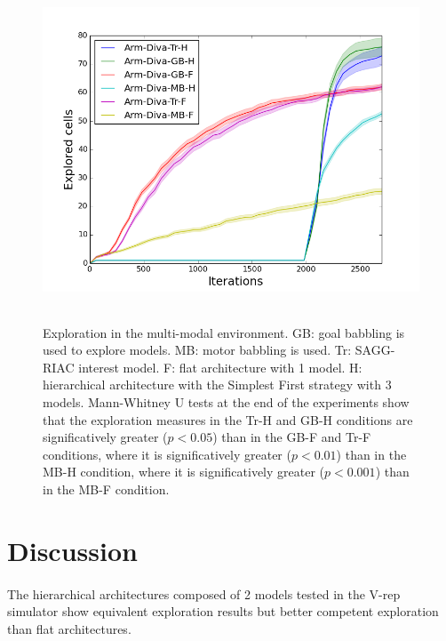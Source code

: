 \documentclass[12pt]{article}
\begin{document}
		\begin{figure}[H]
			\centering
			\includegraphics[height=4in]{./include/explo-2015-05-27_11-51-43-ARM-DIVA.png}
			\caption{Exploration in the multi-modal environment. GB: goal babbling is used to explore models. MB: motor babbling is used. Tr: SAGG-RIAC interest model. F: flat architecture with 1 model. 
			H: hierarchical architecture with the Simplest First strategy with 3 models.					 
			Mann-Whitney U tests at the end of the experiments show that the exploration measures in the Tr-H and GB-H conditions
			are significatively greater ($p<0.05$) than in the GB-F and Tr-F conditions,
			where it is significatively greater ($p<0.01$) than in the MB-H condition,
			where it is significatively greater ($p<0.001$) than in the MB-F condition.
					 }
			\label{explo_armdiva}
		\end{figure}

	
	
%

\section{Discussion}

	\paragraph{}
	The hierarchical architectures composed of 2 models tested in the V-rep simulator show equivalent exploration results but better competent exploration than flat architectures.
	
\end{document}
